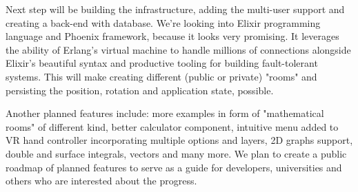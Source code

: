 Next step will be building the infrastructure, adding the multi-user support and creating a back-end with database. We're looking into Elixir programming language and Phoenix framework, because it looks very promising. It leverages the ability of Erlang's virtual machine to handle millions of connections alongside Elixir's beautiful syntax and productive tooling for building fault-tolerant systems. This will make creating different (public or private) "rooms" and persisting the position, rotation and application state, possible.

Another planned features include: more examples in form of "mathematical rooms" of different kind, better calculator component, intuitive menu added to VR hand controller incorporating multiple options and layers, 2D graphs support, double and surface integrals, vectors and many more. We plan to create a public roadmap of planned features to serve as a guide for developers, universities and others who are interested about the progress.